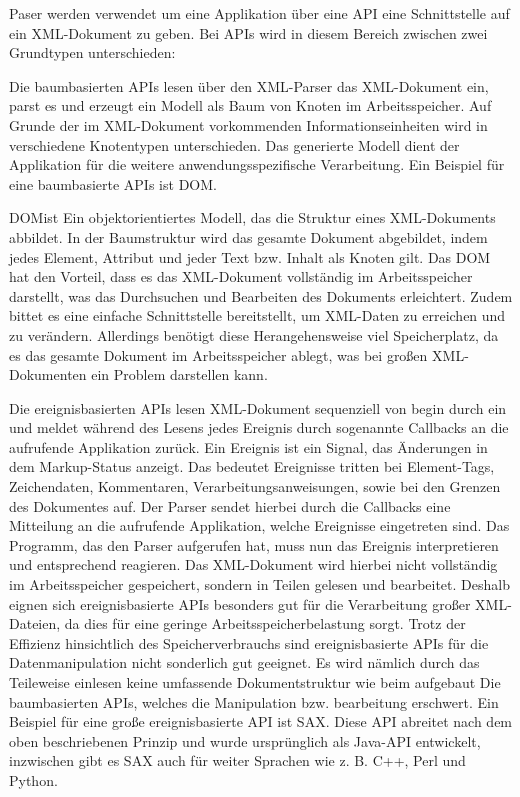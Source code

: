 Paser werden verwendet um eine Applikation über eine \ac{API} eine Schnittstelle auf ein \ac{XML}-Dokument zu geben.
Bei \ac{API}s wird in diesem Bereich zwischen zwei Grundtypen unterschieden:\cite*[405]{Becher2022}

Die baumbasierten \ac{API}s lesen über den \ac{XML}-Parser das \ac{XML}-Dokument ein,
parst es und erzeugt ein Modell als Baum von Knoten im Arbeitsspeicher.
Auf Grunde der im \ac{XML}-Dokument vorkommenden Informationseinheiten wird in verschiedene Knotentypen unterschieden.
Das generierte Modell dient der Applikation für die weitere anwendungsspezifische Verarbeitung.
Ein Beispiel für eine baumbasierte \ac{API}s ist \ac{DOM}.

\ac{DOM}ist Ein objektorientiertes Modell, das die Struktur eines \ac{XML}-Dokuments abbildet.
In der Baumstruktur wird das gesamte Dokument abgebildet, indem jedes Element, Attribut und jeder Text bzw. Inhalt als Knoten gilt.
Das \ac{DOM} hat den Vorteil, dass es das \ac{XML}-Dokument vollständig im Arbeitsspeicher darstellt, was das Durchsuchen und Bearbeiten des Dokuments erleichtert.
Zudem bittet es eine einfache Schnittstelle bereitstellt, um XML-Daten zu erreichen und zu verändern.
Allerdings benötigt diese Herangehensweise viel Speicherplatz,
da es das gesamte Dokument im Arbeitsspeicher ablegt, was bei großen \ac{XML}-Dokumenten ein Problem darstellen kann.\cite*[413,414]{Becher2022}


Die ereignisbasierten \ac{API}s lesen \ac{XML}-Dokument sequenziell von begin durch
ein und meldet während des Lesens jedes Ereignis durch sogenannte Callbacks an die aufrufende Applikation zurück.
Ein Ereignis ist ein Signal, das Änderungen in dem Markup-Status anzeigt.
Das bedeutet Ereignisse tritten bei Element-Tags, Zeichendaten, Kommentaren, Verarbeitungsanweisungen, sowie bei den Grenzen des Dokumentes auf.
Der Parser sendet hierbei durch die Callbacks eine Mitteilung an die aufrufende Applikation, welche Ereignisse eingetreten sind.
Das Programm, das den Parser aufgerufen hat, muss nun das Ereignis interpretieren und entsprechend reagieren.
Das \ac{XML}-Dokument wird hierbei nicht vollständig im Arbeitsspeicher gespeichert, sondern in Teilen gelesen und bearbeitet.
Deshalb eignen sich ereignisbasierte \ac{API}s besonders gut für die Verarbeitung großer \ac{XML}-Dateien, da dies für eine geringe Arbeitsspeicherbelastung sorgt.
Trotz der Effizienz hinsichtlich des Speicherverbrauchs sind ereignisbasierte \ac{API}s für die Datenmanipulation nicht sonderlich gut geeignet.
Es wird nämlich durch das Teileweise einlesen keine umfassende Dokumentstruktur wie beim aufgebaut Die baumbasierten \ac{API}s,
welches die Manipulation bzw. bearbeitung erschwert.
Ein Beispiel für eine große ereignisbasierte \ac{API} ist \ac{SAX}.
Diese \ac{API} abreitet nach dem oben beschriebenen Prinzip und wurde ursprünglich als Java-\ac{API} entwickelt, inzwischen gibt es \ac{SAX} auch für weiter Sprachen wie
z. B. C++, Perl und Python.\cite*[405]{Becher2022}

